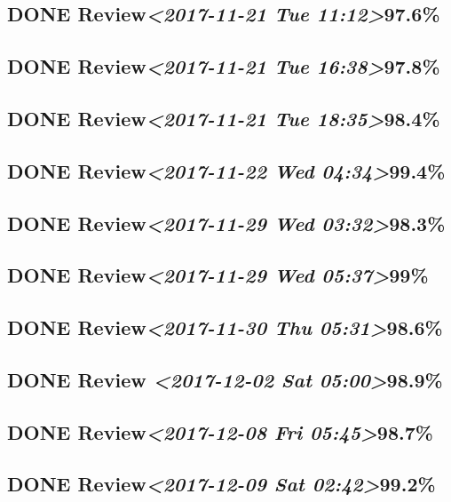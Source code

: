 \documentclass[11pt]{ctexart}
\begin{document}
\subsection{{\bfseries\sffamily DONE} Review\textit{<2017-11-21 Tue 11:12>}97.6\%}
\label{sec:org5f4e83a}
\subsection{{\bfseries\sffamily DONE} Review\textit{<2017-11-21 Tue 16:38>}97.8\%}
\label{sec:org343efcc}
\subsection{{\bfseries\sffamily DONE} Review\textit{<2017-11-21 Tue 18:35>}98.4\%}
\label{sec:org7330d78}
\subsection{{\bfseries\sffamily DONE} Review\textit{<2017-11-22 Wed 04:34>}99.4\%}
\label{sec:org00c6c07}
\subsection{{\bfseries\sffamily DONE} Review\textit{<2017-11-29 Wed 03:32>}98.3\%}
\label{sec:org7ea00e2}
\subsection{{\bfseries\sffamily DONE} Review\textit{<2017-11-29 Wed 05:37>}99\%}
\label{sec:org881f711}
\subsection{{\bfseries\sffamily DONE} Review\textit{<2017-11-30 Thu 05:31>}98.6\%}
\label{sec:org8b2cef3}
\subsection{{\bfseries\sffamily DONE} Review \textit{<2017-12-02 Sat 05:00>}98.9\%}
\label{sec:orgf59d909}
\subsection{{\bfseries\sffamily DONE} Review\textit{<2017-12-08 Fri 05:45>}98.7\%}
\label{sec:orge200b0b}
\subsection{{\bfseries\sffamily DONE} Review\textit{<2017-12-09 Sat 02:42>}99.2\%}
\label{sec:orgd11d587}
\end{document}

